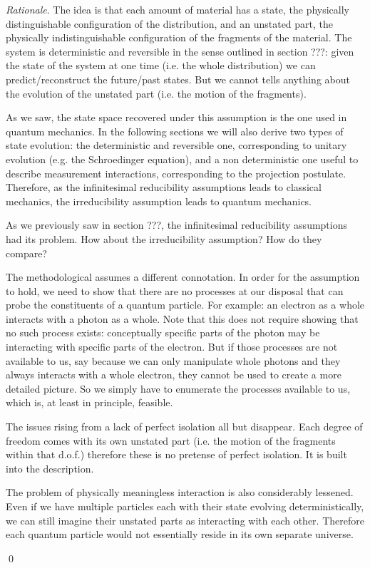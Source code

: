 \documentclass[aps,pra,10pt,twocolumn,floatfix,nofootinbib]{revtex4-1}
\numberwithin{equation}{section}
\theoremstyle{definition}
\newenvironment{rationale}{\emph{Rationale}.}{\qed}
\begin{document}
\begin{rationale}
	The idea is that each amount of material has a state, the physically distinguishable configuration of the distribution, and an unstated part, the physically indistinguishable configuration of the fragments of the material. The system is deterministic and reversible in the sense outlined in section ???: given the state of the system at one time (i.e. the whole distribution) we can predict/reconstruct the future/past states. But we cannot tells anything about the evolution of the unstated part (i.e. the motion of the fragments).
	
	As we saw, the state space recovered under this assumption is the one used in quantum mechanics. In the following sections we will also derive two types of state evolution: the deterministic and reversible one, corresponding to unitary evolution (e.g. the Schroedinger equation), and a non deterministic one useful to describe measurement interactions, corresponding to the projection postulate. Therefore, as the infinitesimal reducibility assumptions leads to classical mechanics, the irreducibility assumption leads to quantum mechanics.
	
	As we previously saw in section ???, the infinitesimal reducibility assumptions had its problem. How about the irreducibility assumption? How do they compare?
	
	The methodological assumes a different connotation. In order for the assumption to hold, we need to show that there are no processes at our disposal that can probe the constituents of a quantum particle. For example: an electron as a whole interacts with a photon as a whole. Note that this does not require showing that no such process exists: conceptually specific parts of the photon may be interacting with specific parts of the electron. But if those processes are not available to us, say because we can only manipulate whole photons and they always interacts with a whole electron, they cannot be used to create a more detailed picture. So we simply have to enumerate the processes available to us, which is, at least in principle, feasible.

	The issues rising from a lack of perfect isolation all but disappear. Each degree of freedom comes with its own unstated part (i.e. the motion of the fragments within that d.o.f.) therefore these is no pretense of perfect isolation. It is built into the description.
	
	The problem of physically meaningless interaction is also considerably lessened. Even if we have multiple particles each with their state evolving deterministically, we can still imagine their unstated parts as interacting with each other. Therefore each quantum particle would not essentially reside in its own separate universe.
	

\end{rationale}
\end{document}
